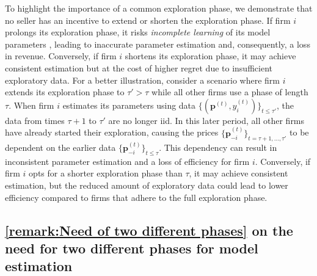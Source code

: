 \documentclass{article} %
\begin{document}
To highlight the importance of a common exploration phase, we demonstrate that no seller has an incentive to extend or shorten the exploration phase. If firm $i$ prolongs its exploration phase, it risks \emph{incomplete learning} of its model parameters \citep{keskin2018incomplete}, leading to inaccurate parameter estimation and, consequently, a loss in revenue. Conversely, if firm $i$ shortens its exploration phase, it may achieve consistent estimation but at the cost of higher regret due to insufficient exploratory data. For a better illustration, consider a scenario where firm $i$ extends its exploration phase to $\tau'>\tau$ while all other firms use a phase of length $\tau$. When firm $i$ estimates its parameters using data $\{(\mathbf{p}^{(t)},y_i^{(t)})\}_{t\leq \tau'}$, the data from times $\tau+1$ to $\tau'$ are no longer iid. In this later period, all other firms have already started their exploration, causing the prices $\{\mathbf{p}_{-i}^{(t)}\}_{t=\tau+1,\dots,\tau'}$ to be dependent on the earlier data $\{\mathbf{p}_{-i}^{(t)}\}_{t\leq \tau}$. This dependency can result in inconsistent parameter estimation and a loss of efficiency for firm $i$. Conversely, if firm $i$ opts for a shorter exploration phase than $\tau$, it may achieve consistent estimation, but the reduced amount of exploratory data could lead to lower efficiency compared to firms that adhere to the full exploration phase.


\subsection{\cref{remark:Need of two different phases} on the need for two different phases for model estimation}\label{sec:remark_on_need_two_phases}
\end{document}
